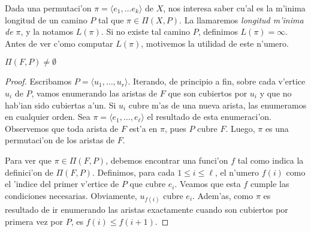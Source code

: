 %	
%	
%
%
%

Dada una permutaci'on $\pi = \langle e_1, \dots e_k \rangle$ de $X$, nos interesa saber cu'al es la m'inima longitud de un camino $P$ tal que $\pi \in \Pi(X, P)$. La llamaremos \textit{longitud m'inima de $\pi$}, y la notamos $L(\pi)$. Si no existe tal camino $P$, definimos $L(\pi) = \infty$. Antes de ver c'omo computar $L(\pi)$, motivemos la utilidad de este n'umero.

\begin{proposition}
\label{pr:pi}
$\Pi(F, P) \neq \emptyset$

\begin{proof}
Escribamos $P = \langle u_1, \dots, u_r \rangle$. Iterando, de principio a fin, sobre cada v'ertice $u_i$ de $P$, vamos enumerando las aristas de $F$ que son cubiertos por $u_i$ y que no hab'ian sido cubiertas a'un. Si $u_i$ cubre m'as de una nueva arista, las enumeramos en cualquier orden. Sea $\pi = \langle e_1, \dots, e_{\ell} \rangle$ el resultado de esta enumeraci'on. Observemos que toda arista de $F$ est'a en $\pi$, pues $P$ cubre $F$. Luego, $\pi$ es una permutaci'on de los aristas de $F$.

Para ver que $\pi \in \Pi(F, P)$, debemos encontrar una funci'on $f$ tal como indica la definici'on de $\Pi(F, P)$. Definimos, para cada $1 \leq i \leq \ell$, el n'umero $f(i)$ como el 'indice del primer v'ertice de $P$ que cubre $e_i$. Veamos que esta $f$ cumple las condiciones necesarias. Obviamente, $u_{f(i)}$ cubre $e_i$. Adem'as, como $\pi$ es resultado de ir enumerando las aristas exactamente cuando son cubiertos por primera vez por $P$, es $f(i) \leq f(i + 1)$.
\end{proof}
\end{proposition}

